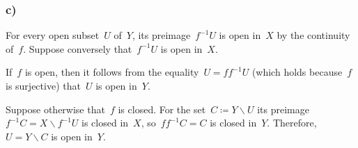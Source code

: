 


\subsubsection{c)}

For every open subset~$U$ of~$Y$, its preimage~$f^{-1} U$ is open in~$X$ by the continuity of~$f$.
Suppose conversely that~$f^{-1} U$ is open in~$X$.

If~$f$ is open, then it follows from the equality~$U = f f^{-1} U$ (which holds because~$f$ is surjective) that~$U$ is open in~$Y$.

Suppose otherwise that~$f$ is closed.
For the set~$C ≔ Y ∖ U$ its preimage~$f^{-1} C = X ∖ f^{-1} U$ is closed in~$X$, so~$f f^{-1} C = C$ is closed in~$Y$.
Therefore,~$U = Y ∖ C$ is open in~$Y$.
